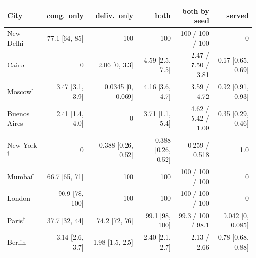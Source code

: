 \begin{tabular}{lrrrrr}
\toprule
City & cong.\ only & deliv.\ only & both & both by seed & served \\
\midrule
New Delhi & 77.1 [64, 85] & 100 & 100 & 100 / 100 / 100 & 0 \\
Cairo$^\dagger$ & 0 & 2.06 [0, 3.3] & 4.59 [2.5, 7.5] & 2.47 / 7.50 / 3.81 & 0.67 [0.65, 0.69] \\
Moscow$^\dagger$ & 3.47 [3.1, 3.9] & 0.0345 [0, 0.069] & 4.16 [3.6, 4.7] & 3.59 / 4.72 & 0.92 [0.91, 0.93] \\
Buenos Aires & 2.41 [1.4, 4.0] & 0 & 3.71 [1.1, 5.4] & 4.62 / 5.42 / 1.09 & 0.35 [0.29, 0.46] \\
New York$^\dagger$ & 0 & 0.388 [0.26, 0.52] & 0.388 [0.26, 0.52] & 0.259 / 0.518 & 1.0 \\
Mumbai$^\dagger$ & 66.7 [65, 71] & 100 & 100 & 100 / 100 / 100 & 0 \\
London & 90.9 [78, 100] & 100 & 100 & 100 / 100 / 100 & 0 \\
Paris$^\dagger$ & 37.7 [32, 44] & 74.2 [72, 76] & 99.1 [98, 100] & 99.3 / 100 / 98.1 & 0.042 [0, 0.085] \\
Berlin$^\dagger$ & 3.14 [2.6, 3.7] & 1.98 [1.5, 2.5] & 2.40 [2.1, 2.7] & 2.13 / 2.66 & 0.78 [0.68, 0.88] \\
\bottomrule
\end{tabular}
